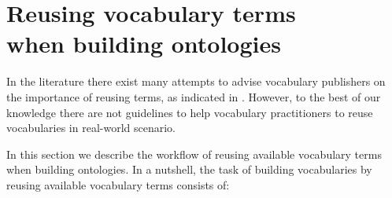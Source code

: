 

\section{Reusing vocabulary terms\\ when building ontologies}\label{sec:reuse}

In the literature there exist many attempts to advise vocabulary publishers on the importance of reusing terms, as indicated in . However, to the best of our knowledge there are not guidelines to help vocabulary practitioners to reuse vocabularies in real-world scenario. 

In this section we describe the workflow of reusing available vocabulary terms when building ontologies. In a nutshell, the task of building vocabularies by reusing available vocabulary terms consists of:

